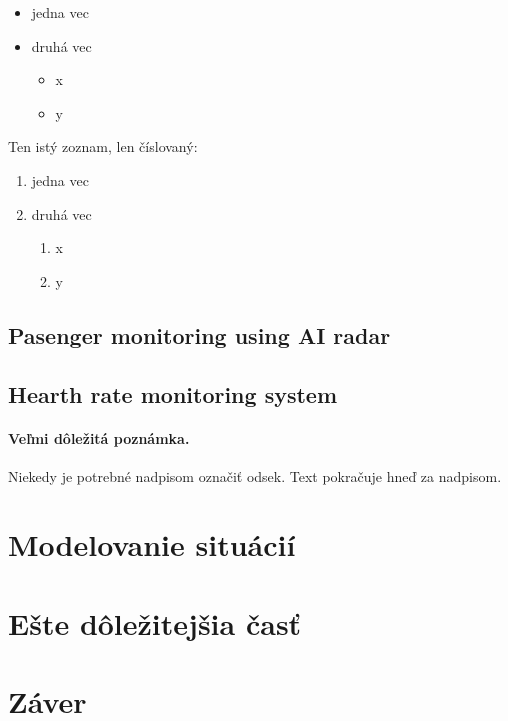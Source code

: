 \documentclass[10pt,twoside,slovak,a4paper]{article}
\begin{document}
\begin{itemize}
\item jedna vec
\item druhá vec
	\begin{itemize}
	\item x
	\item y
	\end{itemize}
\end{itemize}

Ten istý zoznam, len číslovaný:

\begin{enumerate}
\item jedna vec
\item druhá vec
	\begin{enumerate}
	\item x
	\item y
	\end{enumerate}
\end{enumerate}


\subsection{Pasenger monitoring using AI radar} \label{predstavenie:radar}

\subsection{Hearth rate monitoring system} \label{predstavenie:hearth}

\paragraph{Veľmi dôležitá poznámka.}
Niekedy je potrebné nadpisom označiť odsek. Text pokračuje hneď za nadpisom.



\section{Modelovanie situácií} \label{modelovanie}




\section{Ešte dôležitejšia časť} \label{dolezitejsia}




\section{Záver} \label{zaver} %







\end{document}
